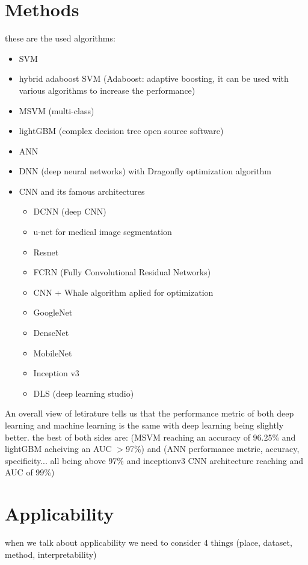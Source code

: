 \section{Methods}
    these are the used algorithms:
    \begin{itemize}
        \item SVM 
        \item hybrid adaboost SVM (Adaboost: adaptive boosting, it can be used with various algorithms to increase the performance)
        \item MSVM (multi-class) 
        \item lightGBM (complex decision tree open source software) 
        \item ANN
        \item DNN (deep neural networks) with Dragonfly optimization algorithm 
        \item CNN and its famous architectures 
        \begin{itemize}
            \item DCNN (deep CNN) 
            \item u-net for medical image segmentation
            \item Resnet 
            \item FCRN (Fully Convolutional Residual Networks) 
            \item CNN + Whale algorithm aplied for optimization
            \item GoogleNet 
            \item DenseNet 
            \item MobileNet 
            \item Inception v3
            \item DLS (deep learning studio) 
        \end{itemize}
    \end{itemize}
    An overall view of letirature tells us that the performance metric of both deep learning and machine learning is the same with deep learning being slightly better. the best of both sides are: (MSVM reaching an accuracy of 96.25\% and lightGBM acheiving an AUC $>$97\%) and (ANN performance metric, accuracy, specificity... all being above 97\% and inceptionv3 CNN architecture reaching and AUC of 99\%) 


    
\section{Applicability}
    when we talk about applicability we need to consider 4 things (place, dataset, method, interpretability)
    
